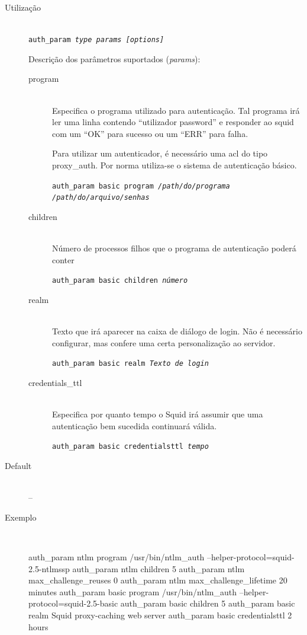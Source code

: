 \begin{description}
\item[Utilização]~\\
\texttt{auth\_param \emph{type} \emph{params} \emph{[options]}}

Descrição dos parâmetros suportados (\emph{params}):

\begin{description}
\item[program]~\\
Especifica o programa utilizado para autenticação.  
Tal programa irá ler uma linha contendo ``utilizador password''
e responder ao squid com um ``OK'' para sucesso ou um ``ERR''
para falha.

Para utilizar um autenticador, é necessário uma acl do
tipo proxy\_auth.  
Por norma utiliza-se o sistema de autenticação básico.

\texttt{auth\_param basic program \emph{/path/do/programa}
\emph{/path/do/arquivo/senhas}}

\item[children]~\\
Número de processos filhos que o programa de autenticação
poderá conter

\texttt{auth\_param basic children \emph{número}}

\item[realm]~\\
Texto que irá aparecer na caixa de diálogo de login. Não é
necessário configurar, mas confere uma certa personalização ao
servidor.

\texttt{auth\_param basic realm \emph{Texto de login}}

\item[credentials\_ttl]~\\
Especifica por quanto tempo o Squid irá assumir que uma
autenticação bem sucedida continuará válida.

\texttt{auth\_param basic credentialsttl \emph{tempo}}
\end{description}

\item[Default]~\\
--

\item[Exemplo]~\\
\begin{Output}
auth_param ntlm program /usr/bin/ntlm_auth --helper-protocol=squid-2.5-ntlmssp
auth_param ntlm children 5
auth_param ntlm max_challenge_reuses 0
auth_param ntlm max_challenge_lifetime 20 minutes
auth_param basic program /usr/bin/ntlm_auth --helper-protocol=squid-2.5-basic
auth_param basic children 5
auth_param basic realm Squid proxy-caching web server
auth_param basic credentialsttl 2 hours
\end{Output}
\end{description}


